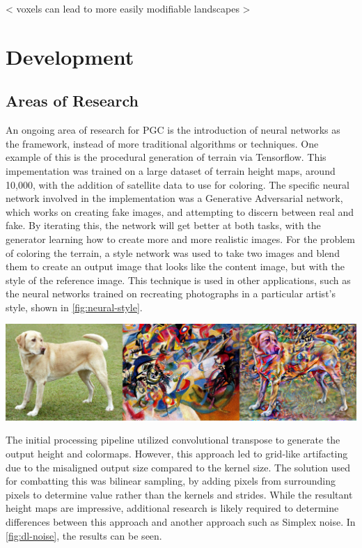 \documentclass[10pt]{report}
\begin{document}
		< voxels can lead to more easily modifiable landscapes >
	
	\vspace{10pt}
	\let\clearpage\relax
	\chapter{Development}

		\section{Areas of Research}
	
		An ongoing area of research for PGC is the introduction of neural networks as the framework, instead of more traditional algorithms or techniques. One example of this is the procedural generation of terrain via Tensorflow. This impementation was trained on a large dataset of terrain height maps, around 10,000, with the addition of satellite data to use for coloring. The specific neural network involved in the implementation was a Generative Adversarial network, which works on creating fake images, and attempting to discern between real and fake. By iterating this, the network will get better at both tasks, with the generator learning how to create more and more realistic images. For the problem of coloring the terrain, a style network was used to take two images and blend them to create an output image that looks like the content image, but with the style of the reference image. This technique is used in other applications, such as the neural networks trained on recreating photographs in a particular artist's style, shown in \autoref{fig:neural-style}. 
		
		\begin{minipage}{\textwidth}
			\centering
			\includegraphics[scale=.3]{stylized-image}
			\label{fig:neural-style}
		\end{minipage}
	
		The initial processing pipeline utilized convolutional transpose to generate the output height and colormaps. However, this approach led to grid-like artifacting due to the misaligned output size compared to the kernel size. The solution used for combatting this was bilinear sampling, by adding pixels from surrounding pixels to determine value rather than the kernels and strides. While the resultant height maps are impressive, additional research is likely required to determine differences between this approach and another approach such as Simplex noise. In \autoref{fig:dl-noise}, the results can be seen. 
		
\end{document}
